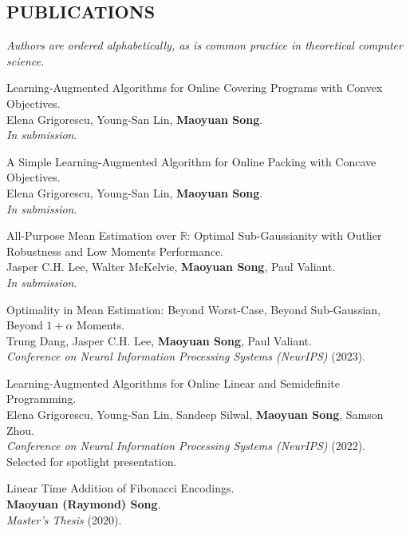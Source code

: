 \documentclass[margin, 10pt]{res} %
\begin{document}
\begin{resume}
\section{PUBLICATIONS}
{\it Authors are ordered alphabetically, as is common practice in theoretical computer science.}
\begin{etaremune}
\item Learning-Augmented Algorithms for Online Covering Programs with Convex Objectives.\\
Elena Grigorescu, Young-San Lin, {\bf Maoyuan Song}.\\
\emph{In submission}.
\item A Simple Learning-Augmented Algorithm for Online Packing with Concave Objectives.\\
Elena Grigorescu, Young-San Lin, {\bf Maoyuan Song}.\\
\emph{In submission}.
\item All-Purpose Mean Estimation over $\mathbb{R}$: Optimal Sub-Gaussianity with Outlier Robustness and Low Moments Performance.\\
Jasper C.H. Lee, Walter McKelvie, {\bf Maoyuan Song}, Paul Valiant.\\
\emph{In submission}.
\item Optimality in Mean Estimation: Beyond Worst-Case, Beyond Sub-Gaussian, Beyond $1 + \alpha$ Moments.\\
Trung Dang, Jasper C.H. Lee, {\bf Maoyuan Song}, Paul Valiant.\\
\emph{Conference on Neural Information Processing Systems (NeurIPS)} (2023).
\item Learning-Augmented Algorithms for Online Linear and Semidefinite Programming.\\
Elena Grigorescu, Young-San Lin, Sandeep Silwal, {\bf Maoyuan Song}, Samson Zhou.\\
\emph{Conference on Neural Information Processing Systems (NeurIPS)} (2022). Selected for spotlight presentation.
\item Linear Time Addition of Fibonacci Encodings.\\
{\bf Maoyuan (Raymond) Song}.\\
\emph{Master's Thesis} (2020). 
\end{etaremune}


\end{resume}
\end{document}
